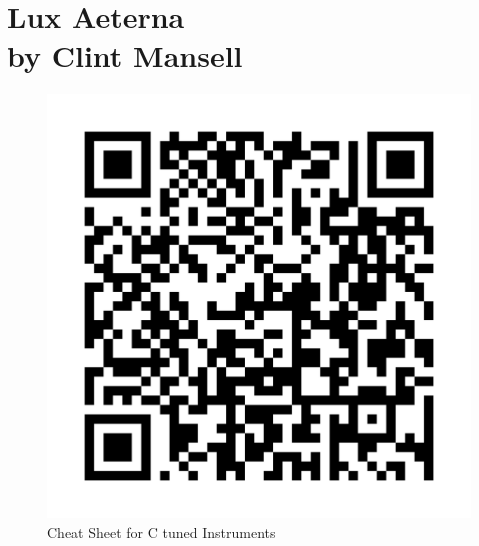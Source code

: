 \chapter[Lux Aeterna]{Lux Aeterna \\[1ex]\large{by Clint Mansell}}
\begin{figure}
\includegraphics[width=1\linewidth]{QR_Codes/QR_LuxAeterna_CheatSheet.png}\\
Cheat Sheet for C tuned Instruments
\end{figure}

